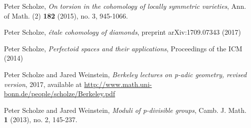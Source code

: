 \documentclass[10pt,oneside]{amsart}
\theoremstyle{definition}
\begin{document}
\begin{thebibliography}{99}
	Peter Scholze,
	\textit{On torsion in the cohomology of locally symmetric varieties}, Ann. of Math. (2) {\bf 182} (2015), no. 3, 945-1066.
	
	Peter Scholze,
	\textit{\'etale cohomology of diamonds}, preprint arXiv:1709.07343 (2017)
	
		Peter Scholze,
		\textit{Perfectoid spaces and their applications},
		Proceedings of the ICM (2014)
	
	Peter Scholze and Jared Weinstein,
	\textit{Berkeley lectures on p-adic geometry, revised version}, 2017, available at \url{http://www.math.uni-bonn.de/people/scholze/Berkeley.pdf} 
	
	Peter Scholze and Jared Weinstein,
	\textit{Moduli of p-divisible groups}, Camb. J. Math. {\bf 1} (2013), no. 2, 145-237.
	
\end{thebibliography}

	
	
	
\end{document}
